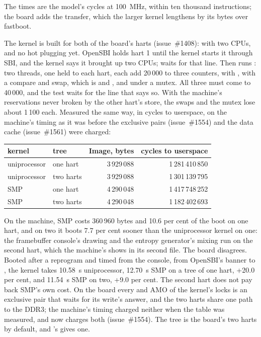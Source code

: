 \documentclass[journal,onecolumn,9pt]{IEEEtran}
\begin{document}
\noindent The times are the model's cycles at 100~MHz, within ten
thousand instructions; the board adds the transfer, which the larger
kernel lengthens by its bytes over fastboot.

The kernel is built for both of the board's harts (issue~\#1408):
 with two CPUs, and no hot plugging yet. OpenSBI
holds hart 1 until the kernel starts it through SBI, and the kernel
says it brought up two CPUs;  waits for that line.
Then  runs : two threads, one held
to each hart, each add 20\,000 to three counters, with ,
with a compare and swap, which is  and , and
under a mutex. All three must come to 40\,000, and the test waits for
the line that says so. With the machine's reservations never broken by
the other hart's store, the swaps and the mutex lose about 1\,100 each.
Measured the same way, in cycles to userspace, on the machine's
timing as it was before the exclusive pairs (issue~\#1554) and the data
cache (issue~\#1561) were charged:

\begin{center}\footnotesize
\begin{tabular}{@{}llrr@{}}
\toprule
kernel & tree & Image, bytes & cycles to userspace \\
\midrule
uniprocessor & one hart & 3\,929\,088 & 1\,281\,410\,850 \\
uniprocessor & two harts & 3\,929\,088 & 1\,301\,139\,795 \\
SMP & one hart & 4\,290\,048 & 1\,417\,748\,252 \\
SMP & two harts & 4\,290\,048 & 1\,182\,402\,693 \\
\bottomrule
\end{tabular}
\end{center}

\noindent On the machine, SMP costs 360\,960 bytes and 10.6 per cent of
the boot on one hart, and on two it boots 7.7 per cent sooner than
the uniprocessor kernel on one: the framebuffer console's drawing and
the entropy generator's mixing run on the second hart, which the
machine's  shows in its second file. The board
disagrees. Booted after a reprogram and timed from the console, from
OpenSBI's banner to , the kernel takes 10.58~s
uniprocessor, 12.70~s SMP on a tree of one hart, +20.0 per cent, and
11.54~s SMP on two, +9.0 per cent. The second hart does not pay back
SMP's own cost. On the board every  and AMO of the kernel's
locks is an exclusive pair that waits for its write's answer, and the
two harts share one path to the DDR3; the machine's timing charged
neither when the table was measured, and now charges both
(issue~\#1554). The tree is the board's two harts by default,
and 's  gives one.
\end{document}
